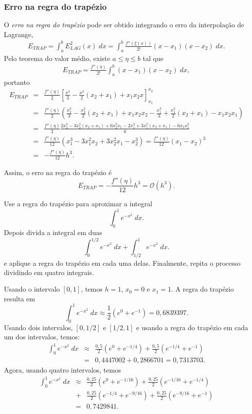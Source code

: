 \subsubsection{Erro na regra do trapézio}
O \textit{erro na regra do trapézio} pode ser obtido integrando o erro da interpolação de Lagrange,
\begin{eqnarray*}
   E_{TRAP} = \int_a^b E^2_{LAG}(x) \;dx= \int_a^b \frac{f''(\xi(x))}{2!}(x-x_1)(x-x_2) \;dx.
\end{eqnarray*}
Pelo teorema do valor médio, existe $a\leq \eta\leq b$ tal que
\begin{eqnarray*}
    E_{TRAP} = \frac{f''(\eta)}{2!}\int_a^b (x-x_1)(x-x_2) \;dx,
\end{eqnarray*}
portanto
\begin{eqnarray*}
     E_{TRAP}
  &=& \frac{f''(\eta)}{2}\left[\frac{x^3}{3}-\frac{x^2}{2}(x_2+x_1)+x_1x_2x\right]_{x_1}^{x_2}\\
  &=& \frac{f''(\eta)}{2}\left(\frac{x_2^3}{3}-\frac{x_2^2}{2}(x_2+x_1)+x_1x_2x_2-\frac{x_1^3}{3}+\frac{x_1^2}{2}(x_2+x_1)-x_1x_2x_1\right)\\
  &=& \frac{f''(\eta)}{2}\frac{2x_2^3-3x_2^2(x_2+x_1)+6x_2^2x_1-2x_1^3+3x_1^2(x_2+x_1)-6x_2x_1^2}{6}\\
  &=& \frac{f''(\eta)}{12}\left(x_1^3-3x_1^2x_2+3x_2^2x_1-x_2^3\right)
   =  \frac{f''(\eta)}{12}(x_1-x_2)^3\\
  &=& -\frac{f''(\eta)}{12}h^3.
\end{eqnarray*}

Assim, o erro na regra do trapézio é
$$
E_{TRAP}  = -\frac{f''(\eta)}{12}h^3 = \mathcal{O}(h^3).
$$

\begin{ex}
Use a regra do trapézio para aproximar a integral
$$
\int_0^1e^{-x^2}\;dx.
$$
Depois divida a integral em duas
$$
\int_0^{1/2}e^{-x^2}\;dx+\int_{1/2}^{1}e^{-x^2}\;dx.
$$
e aplique a regra do trapézio em cada uma delas. Finalmente, repita o processo dividindo em quatro integrais.
\end{ex}
Usando o intervalo $[0,1]$, temos $h=1$, $x_0=0$ e $x_1=1$. A regra do trapézio resulta em
$$
\int_0^1e^{-x^2}\;dx\approx \frac{1}{2}(e^{0}+e^{-1})=0,6839397.
$$
Usando dois intervalos, $[0,1/2]$ e $[1/2,1]$ e usando a regra do trapézio em cada um dos intervalos, temos:
\begin{eqnarray*}
\int_0^1e^{-x^2}\;dx &\approx& \frac{0,5}{2}\left(e^{0}+e^{-1/4}\right) + \frac{0,5}{2}\left(e^{-1/4}+e^{-1}\right) \\
&=& 0,4447002+0,2866701 =0,7313703.
\end{eqnarray*}
Agora, usando quatro intervalos, temos
\begin{eqnarray*}
\int_0^1e^{-x^2}\;dx &\approx& \frac{0,25}{2}\left(e^{0}+e^{-1/16}\right) + \frac{0,25}{2}\left(e^{-1/16}+e^{-1/4}\right) \\
&+& \frac{0,25}{2}\left(e^{-1/4}+e^{-9/16}\right)+\frac{0,25}{2}\left(e^{-9/16}+e^{-1}\right) \\
&=& 0,7429841.
\end{eqnarray*}



